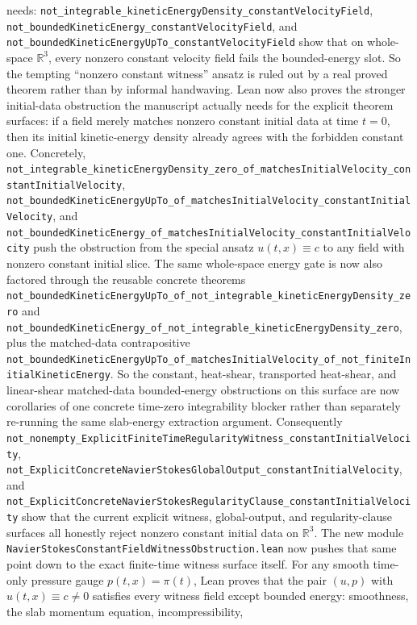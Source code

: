 \documentclass[11pt]{article}
\begin{document}
needs: \texttt{not\_integrable\_kineticEnergyDensity\_constantVelocityField},
\texttt{not\_boundedKineticEnergy\_constantVelocityField}, and
\texttt{not\_boundedKineticEnergyUpTo\_constantVelocityField} show that on
whole-space \(\mathbb{R}^3\), every nonzero constant velocity field fails the
bounded-energy slot.  So the tempting ``nonzero constant witness'' ansatz is
ruled out by a real proved theorem rather than by informal handwaving.  Lean
now also proves the stronger initial-data obstruction the manuscript actually
needs for the explicit theorem surfaces: if a field merely matches nonzero
constant initial data at time \(t=0\), then its initial kinetic-energy density
already agrees with the forbidden constant one.  Concretely,
\texttt{not\_integrable\_kineticEnergyDensity\_zero\_of\_matchesInitialVelocity\_constantInitialVelocity},
\texttt{not\_boundedKineticEnergyUpTo\_of\_matchesInitialVelocity\_constantInitialVelocity},
and \texttt{not\_boundedKineticEnergy\_of\_matchesInitialVelocity\_constantInitialVelocity}
push the obstruction from the special ansatz \(u(t,x) \equiv c\) to any field
with nonzero constant initial slice.  The same whole-space energy gate is now
also factored through the reusable concrete theorems
\texttt{not\_boundedKineticEnergyUpTo\_of\_not\_integrable\_kineticEnergyDensity\_zero}
and
\texttt{not\_boundedKineticEnergy\_of\_not\_integrable\_kineticEnergyDensity\_zero},
plus the matched-data contrapositive
\texttt{not\_boundedKineticEnergyUpTo\_of\_matchesInitialVelocity\_of\_not\_finiteInitialKineticEnergy}.
So the constant, heat-shear, transported heat-shear, and linear-shear
matched-data bounded-energy obstructions on this surface are now corollaries of
one concrete time-zero integrability blocker rather than separately re-running
the same slab-energy extraction argument.  Consequently
\texttt{not\_nonempty\_ExplicitFiniteTimeRegularityWitness\_constantInitialVelocity},
\texttt{not\_ExplicitConcreteNavierStokesGlobalOutput\_constantInitialVelocity},
and \texttt{not\_ExplicitConcreteNavierStokesRegularityClause\_constantInitialVelocity}
show that the current explicit witness, global-output, and regularity-clause
surfaces all honestly reject nonzero constant initial data on \(\mathbb{R}^3\).
The new module \texttt{NavierStokesConstantFieldWitnessObstruction.lean} now
pushes that same point down to the exact finite-time witness surface itself.
For any smooth time-only pressure gauge \(p(t,x)=\pi(t)\), Lean proves that the
pair \((u,p)\) with \(u(t,x)\equiv c\neq 0\) satisfies every witness field
except bounded energy: smoothness, the slab momentum equation, incompressibility,
\end{document}
